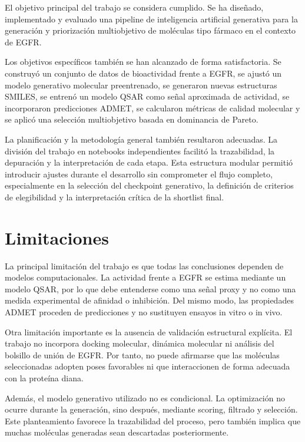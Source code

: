 \documentclass[IB]{TFUOC}%
\begin{document}
El objetivo principal del trabajo se considera cumplido. Se ha diseñado, implementado y evaluado una pipeline de inteligencia artificial generativa para la generación y priorización multiobjetivo de moléculas tipo fármaco en el contexto de EGFR.

Los objetivos específicos también se han alcanzado de forma satisfactoria. Se construyó un conjunto de datos de bioactividad frente a EGFR, se ajustó un modelo generativo molecular preentrenado, se generaron nuevas estructuras SMILES, se entrenó un modelo QSAR como señal aproximada de actividad, se incorporaron predicciones ADMET, se calcularon métricas de calidad molecular y se aplicó una selección multiobjetivo basada en dominancia de Pareto.

La planificación y la metodología general también resultaron adecuadas. La división del trabajo en notebooks independientes facilitó la trazabilidad, la depuración y la interpretación de cada etapa. Esta estructura modular permitió introducir ajustes durante el desarrollo sin comprometer el flujo completo, especialmente en la selección del checkpoint generativo, la definición de criterios de elegibilidad y la interpretación crítica de la shortlist final.

\section{Limitaciones}

La principal limitación del trabajo es que todas las conclusiones dependen de modelos computacionales. La actividad frente a EGFR se estima mediante un modelo QSAR, por lo que debe entenderse como una señal proxy y no como una medida experimental de afinidad o inhibición. Del mismo modo, las propiedades ADMET proceden de predicciones y no sustituyen ensayos in vitro o in vivo.

Otra limitación importante es la ausencia de validación estructural explícita. El trabajo no incorpora docking molecular, dinámica molecular ni análisis del bolsillo de unión de EGFR. Por tanto, no puede afirmarse que las moléculas seleccionadas adopten poses favorables ni que interaccionen de forma adecuada con la proteína diana.

Además, el modelo generativo utilizado no es condicional. La optimización no ocurre durante la generación, sino después, mediante scoring, filtrado y selección. Este planteamiento favorece la trazabilidad del proceso, pero también implica que muchas moléculas generadas sean descartadas posteriormente.
\end{document}
